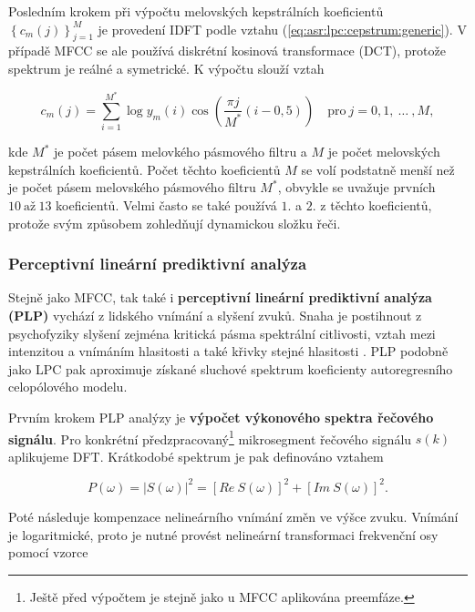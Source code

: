 Posledním krokem při výpočtu melovských kepstrálních koeficientů $\left\{c_m\left(j\right)\right\}_{j=1}^{M}$ je provedení IDFT podle vztahu (\ref{eq:asr:lpc:cepstrum:generic}). V případě MFCC se ale používá diskrétní kosinová transformace (DCT), protože spektrum je reálné a symetrické. K výpočtu slouží vztah

\begin{equation}
  c_{m}(j) = \sum_{i=1}^{M^{*}} \log y_m(i) \cos\left( \frac{\pi j}{M^{*}}\left(i - 0,5\right) \right) \quad \text{pro}\ j = 0, 1,\ \dots\ ,M,
  \label{eq:asr:mfcc:coef}
\end{equation}

\noindent kde $M^{*}$ je počet pásem melovkého pásmového filtru a $M$ je počet melovských kepstrálních koeficientů. Počet těchto koeficientů $M$ se volí podstatně menší než je počet pásem melovského pásmového filtru $M^{*}$, obvykle se uvažuje prvních $10\ \text{až}\ 13$ koeficientů. Velmi často se také používá $1.$ a $2.$ z těchto koeficientů, protože svým způsobem zohledňují dynamickou složku řeči.

\subsubsection{Perceptivní lineární prediktivní analýza}

Stejně jako MFCC, tak také i \textbf{perceptivní lineární prediktivní analýza (PLP)} vychází z lidského vnímání a slyšení zvuků. Snaha je postihnout z psychofyziky slyšení zejména kritická pásma spektrální citlivosti, vztah mezi intenzitou a vnímáním hlasitosti a také křivky stejné hlasitosti \cite{Psutka2006}. PLP podobně jako LPC pak aproximuje získané sluchové spektrum koeficienty autoregresního celopólového modelu.

Prvním krokem PLP analýzy je \textbf{výpočet výkonového spektra řečového signálu}. Pro konkrétní předzpracovaný\footnote{Ještě před výpočtem je stejně jako u MFCC aplikována preemfáze.} mikrosegment řečového signálu $s(k)$ aplikujeme DFT. Krátkodobé spektrum je pak definováno vztahem

\begin{equation}
  P\left(\omega\right) = \left| S\left(\omega\right) \right|^{2} = \left[Re\ S\left(\omega\right)\right]^2 + \left[Im\ S\left( \omega \right) \right]^2.
  \label{eq:asr:plp:spectr}
\end{equation}

\noindent Poté následuje kompenzace nelineárního vnímání změn ve výšce zvuku. Vnímání je logaritmické, proto je nutné provést nelineární transformaci frekvenční osy pomocí vzorce

